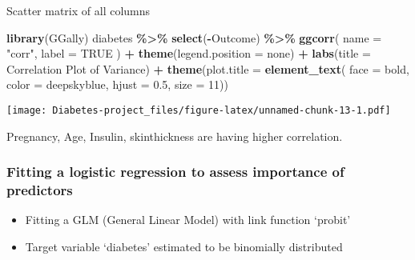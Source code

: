 \documentclass[
]{article}
\newenvironment{Shaded}{\begin{snugshade}}{\end{snugshade}}
\newcommand{\AttributeTok}[1]{\textcolor[rgb]{0.13,0.29,0.53}{#1}}
\newcommand{\ConstantTok}[1]{\textcolor[rgb]{0.56,0.35,0.01}{#1}}
\newcommand{\DecValTok}[1]{\textcolor[rgb]{0.00,0.00,0.81}{#1}}
\newcommand{\FloatTok}[1]{\textcolor[rgb]{0.00,0.00,0.81}{#1}}
\newcommand{\FunctionTok}[1]{\textcolor[rgb]{0.13,0.29,0.53}{\textbf{#1}}}
\newcommand{\NormalTok}[1]{#1}
\newcommand{\SpecialCharTok}[1]{\textcolor[rgb]{0.81,0.36,0.00}{\textbf{#1}}}
\newcommand{\StringTok}[1]{\textcolor[rgb]{0.31,0.60,0.02}{#1}}
\begin{document}
Scatter matrix of all columns

\begin{Shaded}
\begin{Highlighting}[]
\FunctionTok{library}\NormalTok{(GGally)}
\NormalTok{diabetes }\SpecialCharTok{\%\textgreater{}\%} \FunctionTok{select}\NormalTok{(}\SpecialCharTok{{-}}\NormalTok{Outcome) }\SpecialCharTok{\%\textgreater{}\%} 
  \FunctionTok{ggcorr}\NormalTok{(}
    \AttributeTok{name =} \StringTok{"corr"}\NormalTok{, }\AttributeTok{label =} \ConstantTok{TRUE}
\NormalTok{  ) }\SpecialCharTok{+}
  \FunctionTok{theme}\NormalTok{(}\AttributeTok{legend.position =} \StringTok{\textquotesingle{}none\textquotesingle{}}\NormalTok{) }\SpecialCharTok{+}
  \FunctionTok{labs}\NormalTok{(}\AttributeTok{title =} \StringTok{\textquotesingle{}Correlation Plot of Variance\textquotesingle{}}\NormalTok{) }\SpecialCharTok{+}
  \FunctionTok{theme}\NormalTok{(}\AttributeTok{plot.title =} \FunctionTok{element\_text}\NormalTok{(}
    \AttributeTok{face =} \StringTok{\textquotesingle{}bold\textquotesingle{}}\NormalTok{,                                }\AttributeTok{color =} \StringTok{\textquotesingle{}deepskyblue\textquotesingle{}}\NormalTok{,}
    \AttributeTok{hjust =} \FloatTok{0.5}\NormalTok{, }\AttributeTok{size =} \DecValTok{11}\NormalTok{)) }
\end{Highlighting}
\end{Shaded}

\texttt{[image: Diabetes-project\_files/figure-latex/unnamed-chunk-13-1.pdf]}

Pregnancy, Age, Insulin, skinthickness are having higher correlation.

\hypertarget{fitting-a-logistic-regression-to-assess-importance-of-predictors}{%
\subsubsection{\texorpdfstring{\textbf{Fitting a logistic regression to
assess importance of
predictors}}{Fitting a logistic regression to assess importance of predictors}}\label{fitting-a-logistic-regression-to-assess-importance-of-predictors}}

\begin{itemize}
\item
  Fitting a GLM (General Linear Model) with link function `probit'
\item
  Target variable `diabetes' estimated to be binomially distributed
\end{itemize}
\end{document}
